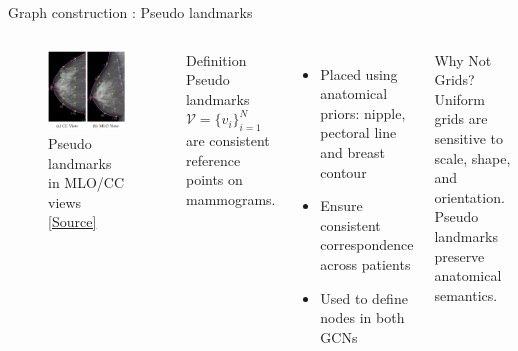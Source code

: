 \documentclass[8pt,aspectratio=169,xcolor=dvipsnames]{beamer}
\begin{document}
\begin{frame}{Graph construction : Pseudo landmarks}
\begin{columns}
    \begin{figure}
        \centering
        \includegraphics[width=0.8\linewidth]{landmarks.png}
        \caption{Pseudo landmarks in MLO/CC views
        \href{https://arxiv.org/abs/2105.10160}{[Source]}}
        \label{fig:enter-label}
    \end{figure}

    \begin{block}{Definition}
    Pseudo landmarks $\mathcal{V} = \{v_i\}_{i=1}^N$ are consistent reference points on mammograms.
    \end{block}

    \begin{itemize}
        \item Placed using anatomical priors: nipple, pectoral line and breast contour
        \item Ensure consistent correspondence across patients
        \item Used to define nodes in both GCNs
    \end{itemize}

    \begin{alertblock}{Why Not Grids?}
    Uniform grids are sensitive to scale, shape, and orientation. Pseudo landmarks preserve anatomical semantics.
    \end{alertblock}
\end{columns}
\end{frame}
\end{document}

